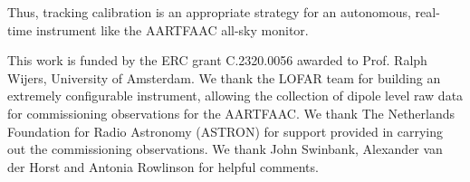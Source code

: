 \documentclass{aa}
\begin{document}
Thus,  tracking calibration  is an appropriate  strategy for  an autonomous,
real-time instrument like the \mbox{AARTFAAC} all-sky monitor.

\begin {acknowledgements}
This work is funded by the ERC grant C.2320.0056 awarded to Prof.  Ralph Wijers,
University  of Amsterdam.  We thank  the LOFAR  team for  building  an extremely
configurable instrument,  allowing the collection  of dipole level raw  data for
commissioning  observations for  the \mbox{AARTFAAC}.  We thank  The Netherlands
Foundation for Radio Astronomy (ASTRON) for support provided in carrying out the
commissioning observations. We thank John  Swinbank, Alexander van der Horst and
Antonia Rowlinson for helpful comments.
\end{acknowledgements}


\end{document}
